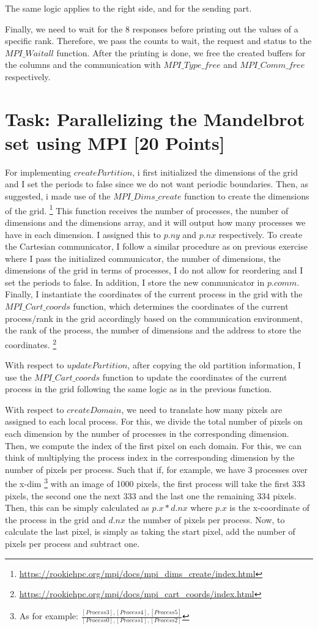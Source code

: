 \documentclass[unicode,11pt,a4paper,oneside,numbers=endperiod,openany]{scrartcl}
\begin{document}
The same logic applies to the right side, and for the sending part. 

Finally, we need to wait for the 8 responses before printing out the values of a specific rank. Therefore, we pass the counts to wait, the request and status to the $MPI\_Waitall$
function. After the printing is done, we free the created buffers for the columns and the communication with $MPI\_Type\_free$ and $MPI\_Comm\_free$ respectively.
\section{Task: Parallelizing the Mandelbrot set using MPI [20 Points]}
For implementing $createPartition$, i first initialized the dimensions of the grid and I set the periods to false since we do not want periodic boundaries.
Then, as suggested, i made use of the $MPI\_Dims\_create$ function to create the dimensions of the grid. \footnote{\url{https://rookiehpc.org/mpi/docs/mpi_dims_create/index.html}} This function receives the number of processes, the number of dimensions and the dimensions array, and
it will output how many processes we have in each dimension. I assigned this to $p.ny$ and $p.nx$ respectively. To create the Cartesian communicator, I follow a similar procedure as on previous exercise where I pass the initialized communicator, the number of dimensions, the dimensions of the grid in terms of processes, I do 
not allow for reordering and I set the periods to false. In addition, I store the new communicator in $p.comm$. Finally, I instantiate the coordinates of the current process in the grid with the $MPI\_Cart\_coords$ function, which determines the coordinates of the current process/rank in the grid accordingly
based on the communication environment, the rank of the process, the number of dimensions and the address to store the coordinates. \footnote{\url{https://rookiehpc.org/mpi/docs/mpi_cart_coords/index.html}}

With respect to $updatePartition$, after copying the old partition information, I use the $MPI\_Cart\_coords$ function to update the coordinates of the current process in the grid following the same logic as in the previous function.

With respect to $createDomain$, we need to translate how many pixels are assigned to each local process. For this, we divide the total number of pixels on each dimension by the number of processes in the corresponding dimension.
Then, we compute the index of the first pixel on each domain. For this, we can think of multiplying the process index in the corresponding dimension by the number of pixels per process. Such that if, for example, we have 
3 processes over the x-dim \footnote{As for example: $\frac{[Process 3], [Process 4], [Process 5]}{[Process 0], [Process 1], [Process 2]}$} with an image of 1000 pixels, the first process will take the first 333 pixels, the second one the next 333 and the last one the remaining 334 pixels.
Then, this can be simply calculated as $p.x * d.nx$ where $p.x$ is the x-coordinate of the process in the grid and $d.nx$ the number of pixels per process. 
Now, to calculate the last pixel, is simply as taking the start pixel, add the number of pixels per process and subtract one. 
\end{document}
